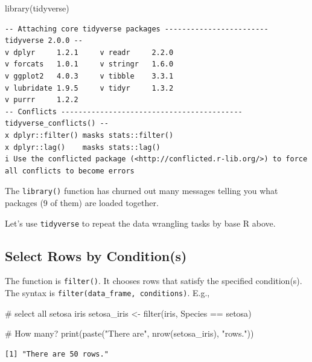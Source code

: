 \documentclass[
  letterpaper,
]{book}
\newenvironment{Shaded}{\begin{snugshade}}{\end{snugshade}}
\newcommand{\CommentTok}[1]{\textcolor[rgb]{0.37,0.37,0.37}{#1}}
\newcommand{\FunctionTok}[1]{\textcolor[rgb]{0.28,0.35,0.67}{#1}}
\newcommand{\NormalTok}[1]{\textcolor[rgb]{0.00,0.23,0.31}{#1}}
\newcommand{\OtherTok}[1]{\textcolor[rgb]{0.00,0.23,0.31}{#1}}
\newcommand{\SpecialCharTok}[1]{\textcolor[rgb]{0.37,0.37,0.37}{#1}}
\newcommand{\StringTok}[1]{\textcolor[rgb]{0.13,0.47,0.30}{#1}}
\begin{document}
\begin{Shaded}
\begin{Highlighting}[]
\FunctionTok{library}\NormalTok{(tidyverse)}
\end{Highlighting}
\end{Shaded}

\begin{verbatim}
-- Attaching core tidyverse packages ------------------------ tidyverse 2.0.0 --
v dplyr     1.2.1     v readr     2.2.0
v forcats   1.0.1     v stringr   1.6.0
v ggplot2   4.0.3     v tibble    3.3.1
v lubridate 1.9.5     v tidyr     1.3.2
v purrr     1.2.2     
-- Conflicts ------------------------------------------ tidyverse_conflicts() --
x dplyr::filter() masks stats::filter()
x dplyr::lag()    masks stats::lag()
i Use the conflicted package (<http://conflicted.r-lib.org/>) to force all conflicts to become errors
\end{verbatim}

The \texttt{library()} function has churned out many messages telling
you what packages (9 of them) are loaded together.

Let's use \texttt{tidyverse} to repeat the data wrangling tasks by base
R above.

\subsection{Select Rows by
Condition(s)}\label{select-rows-by-conditions-1}

The function is \texttt{filter()}. It chooses rows that satisfy the
specified condition(s). The syntax is
\texttt{filter(data\_frame,\ conditions)}. E.g.,

\begin{Shaded}
\begin{Highlighting}[]
\CommentTok{\# select all setosa iris}
\NormalTok{setosa\_iris }\OtherTok{\textless{}{-}} \FunctionTok{filter}\NormalTok{(iris, Species }\SpecialCharTok{==} \StringTok{\textquotesingle{}setosa\textquotesingle{}}\NormalTok{)}

\CommentTok{\# How many?}
\FunctionTok{print}\NormalTok{(}\FunctionTok{paste}\NormalTok{(}\StringTok{"There are"}\NormalTok{, }\FunctionTok{nrow}\NormalTok{(setosa\_iris), }\StringTok{"rows."}\NormalTok{))}
\end{Highlighting}
\end{Shaded}

\begin{verbatim}
[1] "There are 50 rows."
\end{verbatim}
\end{document}
